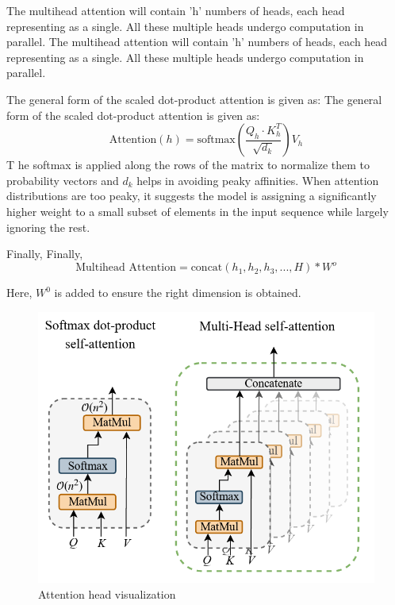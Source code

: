 \noindent The multihead attention will contain 'h' numbers of heads, each head representing as a single. All these multiple heads undergo computation in parallel.
\noindent The multihead attention will contain 'h' numbers of heads, each head representing as a single. All these multiple heads undergo computation in parallel.

\noindent The general form of the scaled dot-product attention is given as:
\noindent The general form of the scaled dot-product attention is given as:
\begin{equation}
    \text{Attention}(h) = \text{softmax}\left(\frac{Q_h \cdot K_h ^T}{\sqrt{d_k}}\right) V_h
\end{equation}
T
\noindent he softmax is applied along the rows of the matrix to normalize them to probability vectors and $d_k$ helps in avoiding peaky affinities. When attention distributions are too peaky, it suggests the model is assigning a significantly higher weight to a small subset of elements in the input sequence while largely ignoring the rest.

\noindent Finally,
\noindent Finally,
\begin{equation}
    \text{Multihead Attention} = \text{concat} (h_1, h_2, h_3,...,H)* W^o
\end{equation}

\noindent Here, $W^0$ is added to ensure the right dimension is obtained.


\begin{figure}[htbp]
    \centering
    \includegraphics[width=5in]{img/Attentionfig.png}
    \caption{{Attention head visualization}}
\end{figure}

